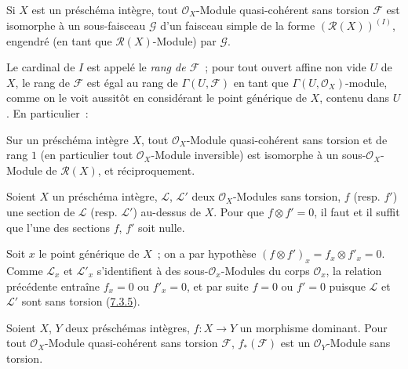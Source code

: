 \begin{proposition}[7.4.2]
\label{I.7.4.2-fr}
Si $X$ est un préschéma intègre, tout $\mathscr{O}_X$-Module quasi-cohérent
sans torsion $\mathscr{F}$ est isomorphe à un sous-faisceau $\mathscr{G}$
d'un faisceau simple de la forme $(\mathscr{R}(X))^{(I)}$, engendré (en tant
que $\mathscr{R}(X)$-Module) par $\mathscr{G}$.
\end{proposition}

Le cardinal de $I$ est appelé le \emph{rang de $\mathscr{F}$}~; pour tout
ouvert affine non vide $U$ de $X$, le rang de $\mathscr{F}$ est égal au rang
de $\Gamma(U,\mathscr{F})$ en tant que $\Gamma(U,\mathscr{O}_X)$-module,
comme on le voit aussitôt en considérant le point générique de $X$, contenu
dans $U$. En particulier~:

\begin{corollary}[7.4.3]
\label{I.7.4.3-fr}
Sur un préschéma intègre $X$, tout $\mathscr{O}_X$-Module quasi-cohérent sans
torsion et de rang $1$ (en particulier tout $\mathscr{O}_X$-Module
inversible) est isomorphe à un sous-$\mathscr{O}_X$-Module de
$\mathscr{R}(X)$, et réciproquement.
\end{corollary}

\begin{corollary}[7.4.4]
\label{I.7.4.4-fr}
Soient $X$ un préschéma intègre, $\mathscr{L}$, $\mathscr{L}'$ deux
$\mathscr{O}_X$-Modules sans torsion, $f$ (resp. $f'$) une section de
$\mathscr{L}$ (resp. $\mathscr{L}'$) au-dessus de $X$. Pour que
$f\otimes f'=0$, il faut et il suffit que l'une des sections $f$, $f'$ soit
nulle.
\end{corollary}

Soit $x$ le point générique de $X$~; on a par hypothèse
$(f\otimes f')_x=f_x\otimes f'_x=0$. Comme $\mathscr{L}_x$ et
$\mathscr{L}'_x$ s'identifient à des sous-$\mathscr{O}_x$-Modules du corps
$\mathscr{O}_x$, la relation précédente entraîne $f_x=0$ ou $f'_x=0$, et par
suite $f=0$ ou $f'=0$ puisque $\mathscr{L}$ et $\mathscr{L}'$ sont sans
torsion (\hyperref[I.7.3.5-fr]{7.3.5}).

\begin{proposition}[7.4.5]
\label{I.7.4.5-fr}
Soient $X$, $Y$ deux préschémas intègres, $f:X\to Y$ un morphisme dominant.
Pour tout $\mathscr{O}_X$-Module quasi-cohérent sans torsion $\mathscr{F}$,
$f_*(\mathscr{F})$ est un $\mathscr{O}_Y$-Module sans torsion.
\end{proposition}

